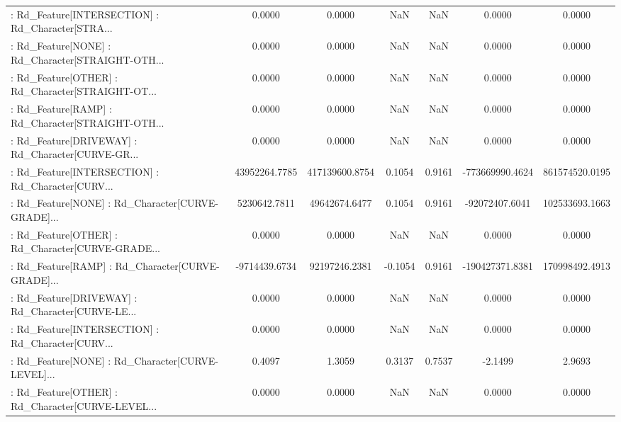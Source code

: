 \begin{longtable}{p{4cm}cccccc}
 : Rd\_Feature[INTERSECTION] : Rd\_Character[STRA... &            0.0000 &            0.0000 &     NaN &          NaN &             0.0000 &            0.0000 \\
 : Rd\_Feature[NONE] : Rd\_Character[STRAIGHT-OTH... &            0.0000 &            0.0000 &     NaN &          NaN &             0.0000 &            0.0000 \\
 : Rd\_Feature[OTHER] : Rd\_Character[STRAIGHT-OT... &            0.0000 &            0.0000 &     NaN &          NaN &             0.0000 &            0.0000 \\
 : Rd\_Feature[RAMP] : Rd\_Character[STRAIGHT-OTH... &            0.0000 &            0.0000 &     NaN &          NaN &             0.0000 &            0.0000 \\
 : Rd\_Feature[DRIVEWAY] : Rd\_Character[CURVE-GR... &            0.0000 &            0.0000 &     NaN &          NaN &             0.0000 &            0.0000 \\
 : Rd\_Feature[INTERSECTION] : Rd\_Character[CURV... &     43952264.7785 &    417139600.8754 &  0.1054 &       0.9161 &    -773669990.4624 &    861574520.0195 \\
 : Rd\_Feature[NONE] : Rd\_Character[CURVE-GRADE]... &      5230642.7811 &     49642674.6477 &  0.1054 &       0.9161 &     -92072407.6041 &    102533693.1663 \\
 : Rd\_Feature[OTHER] : Rd\_Character[CURVE-GRADE... &            0.0000 &            0.0000 &     NaN &          NaN &             0.0000 &            0.0000 \\
 : Rd\_Feature[RAMP] : Rd\_Character[CURVE-GRADE]... &     -9714439.6734 &     92197246.2381 & -0.1054 &       0.9161 &    -190427371.8381 &    170998492.4913 \\
 : Rd\_Feature[DRIVEWAY] : Rd\_Character[CURVE-LE... &            0.0000 &            0.0000 &     NaN &          NaN &             0.0000 &            0.0000 \\
 : Rd\_Feature[INTERSECTION] : Rd\_Character[CURV... &            0.0000 &            0.0000 &     NaN &          NaN &             0.0000 &            0.0000 \\
 : Rd\_Feature[NONE] : Rd\_Character[CURVE-LEVEL]... &            0.4097 &            1.3059 &  0.3137 &       0.7537 &            -2.1499 &            2.9693 \\
 : Rd\_Feature[OTHER] : Rd\_Character[CURVE-LEVEL... &            0.0000 &            0.0000 &     NaN &          NaN &             0.0000 &            0.0000 \\

\end{longtable}
